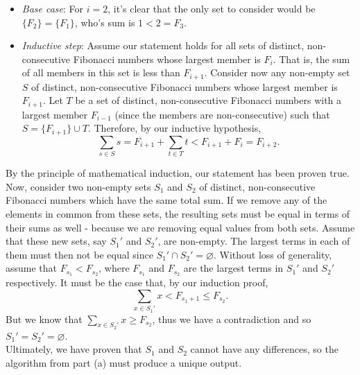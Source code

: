 \documentclass{article}
\begin{document}
\begin{solution}
\begin{enumerate}[label=(\alph*)]
\begin{itemize}
	\item \emph{Base case}: For $i = 2$, it's clear that the only set to consider would be $\{F_2\} = \{F_1\}$, who's sum is $1 < 2 = F_3$.
	\item \emph{Inductive step}: Assume our statement holds for all sets of distinct, non-consecutive Fibonacci numbers whose largest member is $F_i$. That is, the sum of all members in this set is less than $F_{i+1}$. Consider now any non-empty set $S$ of distinct, non-consecutive  Fibonacci numbers whose largest member is $F_{i+1}$. Let $T$ be a set of distinct, non-consecutive Fibonacci numbers with a largest member $F_{i-1}$ (since the members are non-consecutive) such that $S = \{F_{i+1}\} \cup T$. Therefore, by our inductive hypothesis, $$\sum_{s \in S} s = F_{i+1} + \sum_{t \in T} t < F_{i+1} + F_i = F_{i+2}.$$
\end{itemize}
By the principle of mathematical induction, our statement has been proven true. Now, consider two non-empty sets $S_1$ and $S_2$ of distinct, non-consecutive Fibonacci numbers which have the same total sum. If we remove any of the elements in common from these sets, the resulting sets must be equal in terms of their sums as well - because we are removing equal values from both sets. Assume that these new sets, say $S_1'$ and $S_2'$, are non-empty. The largest terms in each of them must then not be equal since $S_1' \cap S_2' = \varnothing$. Without loss of generality, assume that $F_{s_1} < F_{s_2}$, where $F_{s_1}$ and $F_{s_2}$ are the largest terms in $S_1'$ and $S_2'$ respectively. It must be the case that, by our induction proof, \[\sum_{x\in S_1'} x < F_{s_1+1} \leq F_{s_2}.\] But we know that $\displaystyle \sum_{x \in S_2'} x \geq F_{s_2}$, thus we have a contradiction and so $S_1' = S_2' = \varnothing $.\\

Ultimately, we have proven that $S_1$ and $S_2$ cannot have any differences, so the algorithm from part (a) must produce a unique output.
\end{enumerate}
\end{solution}
\end{document}

